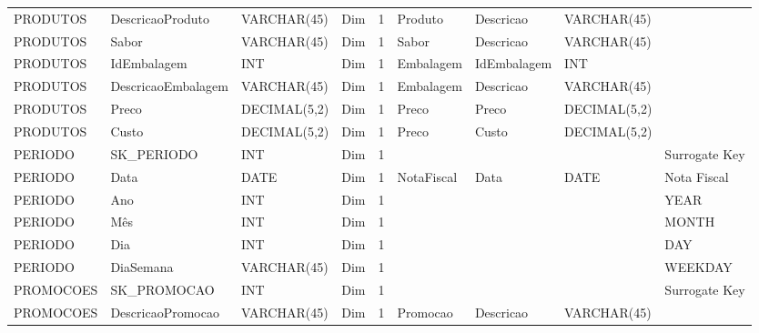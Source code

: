 \begin{landscape}
\begin{longtable}{l|l|l|l|l|l|l|l|l}
{\scriptsize{}PRODUTOS} & {\scriptsize{}DescricaoProduto} & {\scriptsize{}VARCHAR(45)} & {\scriptsize{}Dim} & {\scriptsize{}1} & {\scriptsize{}Produto} & {\scriptsize{}Descricao} & {\scriptsize{}VARCHAR(45)} & \tabularnewline
{\scriptsize{}PRODUTOS} & {\scriptsize{}Sabor} & {\scriptsize{}VARCHAR(45)} & {\scriptsize{}Dim} & {\scriptsize{}1} & {\scriptsize{}Sabor} & {\scriptsize{}Descricao} & {\scriptsize{}VARCHAR(45)} & \tabularnewline
{\scriptsize{}PRODUTOS} & {\scriptsize{}IdEmbalagem} & {\scriptsize{}INT} & {\scriptsize{}Dim} & {\scriptsize{}1} & {\scriptsize{}Embalagem} & {\scriptsize{}IdEmbalagem} & {\scriptsize{}INT} & \tabularnewline
{\scriptsize{}PRODUTOS} & {\scriptsize{}DescricaoEmbalagem} & {\scriptsize{}VARCHAR(45)} & {\scriptsize{}Dim} & {\scriptsize{}1} & {\scriptsize{}Embalagem} & {\scriptsize{}Descricao} & {\scriptsize{}VARCHAR(45)} & \tabularnewline
{\scriptsize{}PRODUTOS} & {\scriptsize{}Preco} & {\scriptsize{}DECIMAL(5,2)} & {\scriptsize{}Dim} & {\scriptsize{}1} & {\scriptsize{}Preco} & {\scriptsize{}Preco} & {\scriptsize{}DECIMAL(5,2)} & \tabularnewline
{\scriptsize{}PRODUTOS} & {\scriptsize{}Custo} & {\scriptsize{}DECIMAL(5,2)} & {\scriptsize{}Dim} & {\scriptsize{}1} & {\scriptsize{}Preco} & {\scriptsize{}Custo} & {\scriptsize{}DECIMAL(5,2)} & \tabularnewline
{\scriptsize{}PERIODO} & {\scriptsize{}SK\_PERIODO} & {\scriptsize{}INT} & {\scriptsize{}Dim} & {\scriptsize{}1} &  &  &  & {\scriptsize{}Surrogate Key}\tabularnewline
{\scriptsize{}PERIODO} & {\scriptsize{}Data} & {\scriptsize{}DATE} & {\scriptsize{}Dim} & {\scriptsize{}1} & {\scriptsize{}NotaFiscal} & {\scriptsize{}Data} & {\scriptsize{}DATE} & {\scriptsize{}Nota Fiscal}\tabularnewline
{\scriptsize{}PERIODO} & {\scriptsize{}Ano} & {\scriptsize{}INT} & {\scriptsize{}Dim} & {\scriptsize{}1} &  &  &  & {\scriptsize{}YEAR}\tabularnewline
{\scriptsize{}PERIODO} & {\scriptsize{}Mês} & {\scriptsize{}INT} & {\scriptsize{}Dim} & {\scriptsize{}1} &  &  &  & {\scriptsize{}MONTH}\tabularnewline
{\scriptsize{}PERIODO} & {\scriptsize{}Dia} & {\scriptsize{}INT} & {\scriptsize{}Dim} & {\scriptsize{}1} &  &  &  & {\scriptsize{}DAY}\tabularnewline
{\scriptsize{}PERIODO} & {\scriptsize{}DiaSemana} & {\scriptsize{}VARCHAR(45)} & {\scriptsize{}Dim} & {\scriptsize{}1} &  &  &  & {\scriptsize{}WEEKDAY}\tabularnewline
{\scriptsize{}PROMOCOES} & {\scriptsize{}SK\_PROMOCAO} & {\scriptsize{}INT} & {\scriptsize{}Dim} & {\scriptsize{}1} &  &  &  & {\scriptsize{}Surrogate Key}\tabularnewline
{\scriptsize{}PROMOCOES} & {\scriptsize{}DescricaoPromocao} & {\scriptsize{}VARCHAR(45)} & {\scriptsize{}Dim} & {\scriptsize{}1} & {\scriptsize{}Promocao} & {\scriptsize{}Descricao} & {\scriptsize{}VARCHAR(45)} & \tabularnewline

\end{longtable}
\end{landscape}
